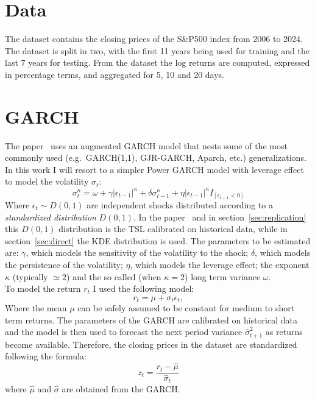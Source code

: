 \documentclass[11pt]{article}
\begin{document}
   \section{Data}\label{sec:data}
    The dataset contains the closing prices of the S\&P500 index from 2006 to 2024.
    The dataset is split in two, with the first 11 years being used for training and the last 7 years for testing.
    From the dataset the log returns are computed, expressed in percentage terms, and aggregated for 5, 10 and 20 days.

    \section{GARCH}
        \label{sec:GARCH}
        The paper~\textcite{thorsten} uses an augmented GARCH model that nests some of the most commonly used (e.g.\ GARCH(1,1), GJR-GARCH, Aparch, etc.) generalizations.
        In this work I will resort to a simpler Power GARCH model with leverage effect to model the volatility $\sigma_t$:
        \begin{equation}
            \label{eq:model}
            \sigma_t^\kappa = \omega + \gamma \left|\epsilon_{t-1}\right|^\kappa + \delta \sigma_{t-1}^\kappa + \eta \left|\epsilon_{t-1}\right|^\kappa I_{[\epsilon_{t-1}<0]}
        \end{equation}
        Where $\epsilon_t \sim D(0,1)$ are independent shocks distributed according to a \textit{standardized distribution} $D(0,1)$.
        In the paper~\textcite{thorsten} and in section~\ref{sec:replication} this $D(0,1)$ distribution is the TSL calibrated on historical data, while in section~\ref{sec:direct} the KDE distribution is used.
        The parameters to be estimated are: $\gamma$, which models the sensitivity of the volatility to the shock; $\delta$, which models the persistence of the volatility; $\eta$, which models the leverage effect; the exponent $\kappa$ (typically $\simeq 2$) and the so called (when $\kappa=2$) long term variance $\omega$.\\
        To model the return $r_t$ I used the following model:
        \begin{equation}
                r_t = \mu + \sigma_t \epsilon_t,
                \label{eq:return_equation}
        \end{equation}
        Where the mean $\mu$ can be safely assumed to be constant for medium to short term returns.
        The parameters of the GARCH are calibrated on historical data and the model is then used to forecast the next period variance $\hat \sigma_{t+1}^2$ as returns become available.
        Therefore, the closing prices in the dataset are standardized following the formula:
        \begin{equation}
            z_t = \frac{r_t - \hat \mu}{\hat \sigma_t}
            \label{eq:standardization_equation}
        \end{equation}
        where $\hat \mu$ and $\hat \sigma$ are obtained from the GARCH\@.
        
\end{document}

